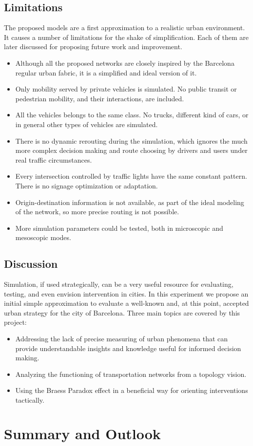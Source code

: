 \documentclass[11pt]{article}
\begin{document}


\subsection{Limitations}
The proposed models are a first approximation to a realistic urban environment. It causes a number of limitations for the shake of simplification. Each of them are later discussed for proposing future work and improvement.

\begin{itemize}
    \item Although all the proposed networks are closely inspired by the Barcelona regular urban fabric, it is a simplified and ideal version of it.
    \item Only mobility served by private vehicles is simulated. No public transit or pedestrian mobility, and their interactions, are included.
    \item All the vehicles belongs to the same class. No trucks, different kind of cars, or in general other types of vehicles are simulated.
    \item There is no dynamic rerouting during the simulation, which ignores the much more complex decision making and route choosing by drivers and users under real traffic circumstances.
    \item Every intersection controlled by traffic lights have the same constant pattern. There is no signage optimization or adaptation.
    \item Origin-destination information is not available, as part of the ideal modeling of the network, so more precise routing is not possible.
    \item More simulation parameters could be tested, both in microscopic and mesoscopic modes.
\end{itemize}

\subsection{Discussion}
Simulation, if used strategically, can be a very useful resource for evaluating, testing, and even envision intervention in cities. In this experiment we propose an initial simple approximation to evaluate a well-known and, at this point, accepted urban strategy for the city of Barcelona.
Three main topics are covered by this project:
\begin{itemize}
    \item Addressing the lack of precise measuring of urban phenomena that can provide understandable insights and knowledge useful for informed decision making.
    \item Analyzing the functioning of transportation networks from a topology vision.
    \item Using the Braess Paradox effect in a beneficial way for orienting interventions tactically.
\end{itemize}






\section{Summary and Outlook}



\end{document}
